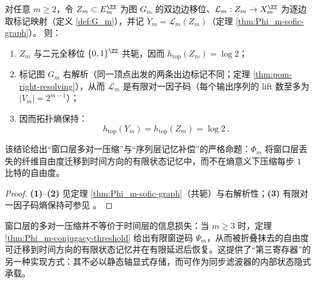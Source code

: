 \begin{corollary}\label{cor:Phi_m-entropy-no-drop}
对任意 \(m\ge 2\)，令 \(Z_m\subset E_m^{\ZZ}\) 为图 \(G_m\) 的双边边移位、\(\mathcal{L}_m:Z_m\to X_m^{\ZZ}\) 为逐边取标记映射（定义 \ref{def:G_m}），并记 \(Y_m=\mathcal{L}_m(Z_m)\)（定理 \ref{thm:Phi_m-sofic-graph}）。
则：
\begin{enumerate}
  \item \(Z_m\) 与二元全移位 \(\{0,1\}^{\ZZ}\) 共轭，因而 \(h_{\mathrm{top}}(Z_m)=\log 2\)；
  \item 标记图 \(G_m\) 右解析（同一顶点出发的两条出边标记不同；定理 \ref{thm:pom-right-resolving}），从而 \(\mathcal{L}_m\) 是有限对一因子码（每个输出序列的 lift 数至多为 \(|V_m|=2^{m-1}\)）；
  \item 因而拓扑熵保持：
  \[
  \boxed{\ h_{\mathrm{top}}(Y_m)=h_{\mathrm{top}}(Z_m)=\log 2\ }.
  \]
\end{enumerate}
该结论给出“窗口层多对一压缩”与“序列层记忆补偿”的严格命题：\(\Phi_m\) 将窗口层丢失的纤维自由度迁移到时间方向的有限状态记忆中，而不在熵意义下压缩每步 \(1\) 比特的自由度。
\end{corollary}
\begin{proof}
\textbf{(1)}--\textbf{(2)} 见定理 \ref{thm:Phi_m-sofic-graph}（共轭）与右解析性；\textbf{(3)} 有限对一因子码熵保持可参见 \cite{LindMarcus1995,Kitchens1998SymbolicDynamics}。
\end{proof}

\begin{remark}[时间记忆作为隐寄存器]\label{rem:Phi-m-memory-implicit-register}
窗口层的多对一压缩并不等价于时间层的信息损失：当 $m\ge 3$ 时，定理 \ref{thm:Phi_m-conjugacy-threshold} 给出有限窗逆码 $\Psi_m$，从而被折叠抹去的自由度可迁移到时间方向的有限状态记忆并在有限延迟后恢复。这提供了“第三寄存器”的另一种实现方式：其不必以静态轴显式存储，而可作为同步滤波器的内部状态隐式承载。
\end{remark}
